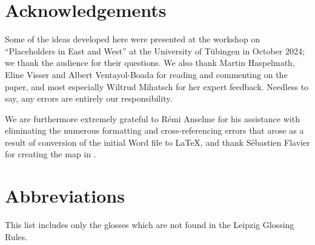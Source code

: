 \documentclass[output=paper]{langscibook}
\begin{document}
\section*{Acknowledgements}

Some of the ideas developed here were presented at the workshop on “Placeholders in East and West” at the University of Tübingen in October 2024; we thank the audience for their questions. We also thank Martin Haspelmath, Eline Visser and Albert Ventayol-Boada for reading and commenting on the paper, and most especially Wiltrud Mihatsch for her expert feedback. Needless to say, any errors are entirely our responsibility.

We are furthermore extremely grateful to Rémi Anselme for his assistance with eliminating the numerous formatting and cross-referencing errors that arose as a result of conversion of the initial Word file to \LaTeX, and thank Sébastien Flavier for creating the map in .

\section*{Abbreviations}
This list includes only the glosses which are not found in the Leipzig Glossing Rules.
\end{document}
